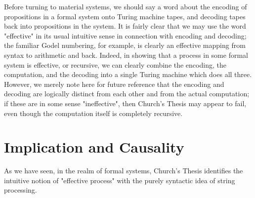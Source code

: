 \documentclass[a4paper,12pt]{article}
\begin{document}
Before turning to material systems, we should say a word about the encoding of propositions
in a formal system onto Turing machine tapes, and decoding tapes back into propositions in the system.
It is fairly clear that we may use the word "effective" in its usual intuitive sense in connection
with encoding and decoding; the familiar Godel numbering, for example, is
clearly an effective mapping from syntax to arithmetic and back. Indeed,
in showing that a process in some formal system is effective, or recursive,
we can clearly combine the encoding, the computation, and the decoding
into a single Turing machine which does all three. However, we merely note
here for future reference that the encoding and decoding are logically distinct from each other
and from the actual computation; if these are in some sense "ineffective", then Church's Thesis
may appear to fail, even though the computation itself is completely recursive.

\section{Implication and Causality}

As we have seen, in the realm of formal systems, Church's Thesis identifies the intuitive notion of "effective process" with the purely syntactic idea of string processing.
\end{document}
